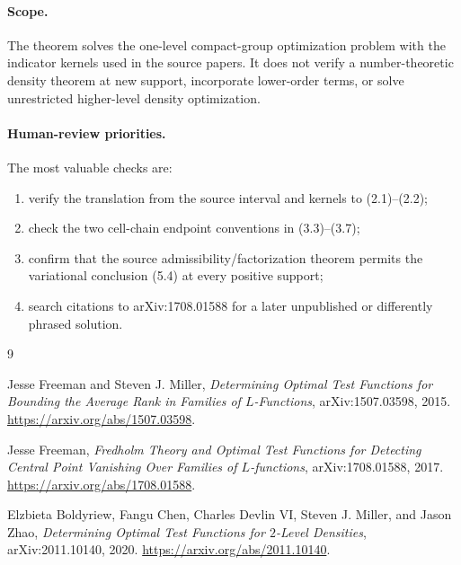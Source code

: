 \documentclass[11pt]{article}
\theoremstyle{definition}
\theoremstyle{remark}
\newcommand{\1}{\mathbf 1}
\begin{document}
\paragraph{Scope.}
The theorem solves the one-level compact-group optimization problem with
the indicator kernels used in the source papers. It does not verify a
number-theoretic density theorem at new support, incorporate lower-order
terms, or solve unrestricted higher-level density optimization.

\paragraph{Human-review priorities.}
The most valuable checks are:
\begin{enumerate}[leftmargin=2em]
\item verify the translation from the source interval and kernels to
      (2.1)--(2.2);
\item check the two cell-chain endpoint conventions in (3.3)--(3.7);
\item confirm that the source admissibility/factorization theorem permits
      the variational conclusion (5.4) at every positive support;
\item search citations to arXiv:1708.01588 for a later unpublished or
      differently phrased solution.
\end{enumerate}

\begin{thebibliography}{9}

Jesse Freeman and Steven J. Miller,
\emph{Determining Optimal Test Functions for Bounding the Average Rank in
Families of $L$-Functions},
arXiv:1507.03598, 2015.
\url{https://arxiv.org/abs/1507.03598}.

Jesse Freeman,
\emph{Fredholm Theory and Optimal Test Functions for Detecting Central Point
Vanishing Over Families of $L$-functions},
arXiv:1708.01588, 2017.
\url{https://arxiv.org/abs/1708.01588}.

Elzbieta Boldyriew, Fangu Chen, Charles Devlin VI, Steven J. Miller, and
Jason Zhao,
\emph{Determining Optimal Test Functions for $2$-Level Densities},
arXiv:2011.10140, 2020.
\url{https://arxiv.org/abs/2011.10140}.

\end{thebibliography}
\end{document}
